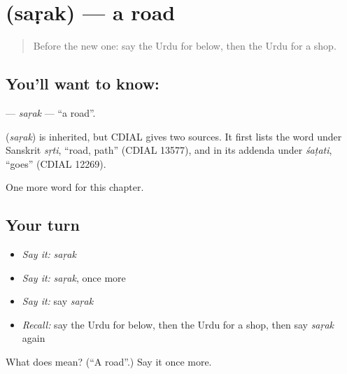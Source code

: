 \section[\texorpdfstring{\ur{سڑک} (saṛak)}{سڑک (saṛak)}]{ (saṛak) — a road}

\label{lesson:UR-C79-sarak}



\begin{quote}
Before the new one: say the Urdu for below, then the Urdu for a shop.
\end{quote}

\subsection*{You'll want to know: }
\textbf{} — \emph{saṛak} — \textquotedblleft{}a road\textquotedblright{}.

\begin{cousinweb}
\textbf{} (\emph{saṛak}) is inherited, but CDIAL gives two sources. It first lists the word under Sanskrit \emph{sṛti}, \textquotedblleft{}road, path\textquotedblright{} (CDIAL 13577), and in its addenda under \emph{śaṭati}, \textquotedblleft{}goes\textquotedblright{} (CDIAL 12269).
\end{cousinweb}

\begin{grammarlens}[title={What you've built}]
One more word for this chapter.
\end{grammarlens}

\subsection*{Your turn}
\begin{itemize}
\raggedright
  \item \emph{Say it:} \emph{saṛak}
  \item \emph{Say it:} \emph{saṛak}, once more
  \item \emph{Say it:} say \emph{saṛak}
  \item \emph{Recall:} say the Urdu for below, then the Urdu for a shop, then say \emph{saṛak} again
\end{itemize}

\begin{tcolorbox}[breakable,colback=teal!4,colframe=teal!35!black,title={Before you move on}]
What does  mean? (\textquotedblleft{}A road\textquotedblright{}.) Say it once more.
\end{tcolorbox}

